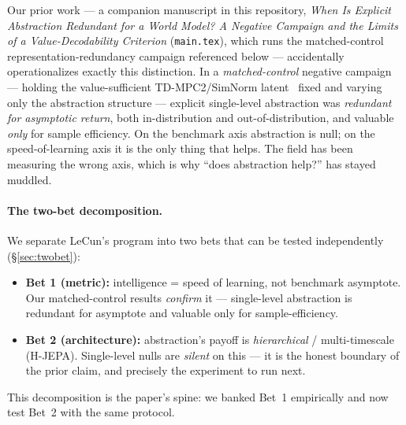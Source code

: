 \documentclass{article}
\begin{document}
Our prior work --- a companion manuscript in this repository,
\emph{When Is Explicit Abstraction Redundant for a World Model? A Negative
Campaign and the Limits of a Value-Decodability Criterion} (\texttt{main.tex}),
which runs the matched-control representation-redundancy campaign referenced
below --- accidentally operationalizes exactly this distinction.
In a \emph{matched-control} negative campaign --- holding the value-sufficient
TD-MPC2/SimNorm latent~\citep{hansen2024tdmpc2} fixed and varying only the
abstraction structure --- explicit single-level abstraction was \emph{redundant
for asymptotic return}, both in-distribution and out-of-distribution, and
valuable \emph{only} for sample efficiency. On the benchmark axis abstraction is
null; on the speed-of-learning axis it is the only thing that helps. The field
has been measuring the wrong axis, which is why ``does abstraction help?'' has
stayed muddled.

\paragraph{The two-bet decomposition.}
We separate LeCun's program into two bets that can be tested independently
(\S\ref{sec:twobet}):
\begin{itemize}
  \item \textbf{Bet 1 (metric):} intelligence = speed of learning, not benchmark
  asymptote. Our matched-control results \emph{confirm} it --- single-level
  abstraction is redundant for asymptote and valuable only for sample-efficiency.
  \item \textbf{Bet 2 (architecture):} abstraction's payoff is \emph{hierarchical}
  / multi-timescale (H-JEPA). Single-level nulls are \emph{silent} on this --- it
  is the honest boundary of the prior claim, and precisely the experiment to run
  next.
\end{itemize}
This decomposition is the paper's spine: we banked Bet~1 empirically and now test
Bet~2 with the same protocol.
\end{document}
